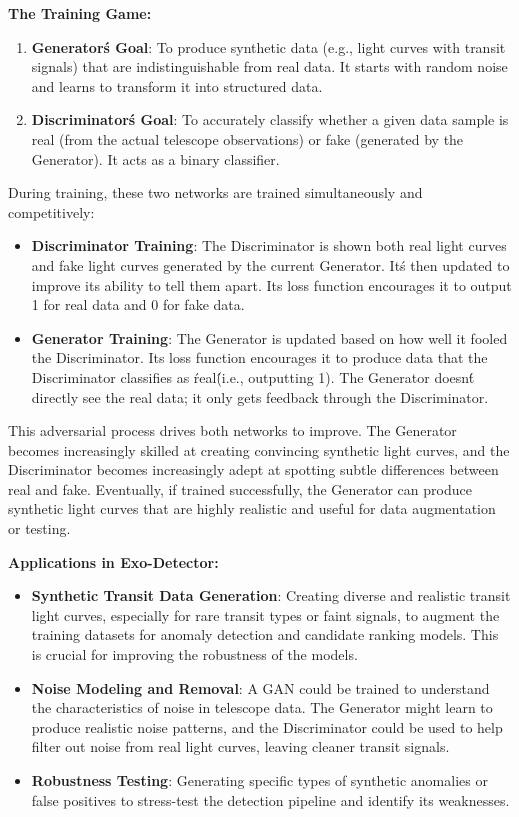 \documentclass{article}
\begin{document}
\textbf{The Training Game:}

\begin{enumerate}
    \item \textbf{Generator\'s Goal}: To produce synthetic data (e.g., light curves with transit signals) that are indistinguishable from real data. It starts with random noise and learns to transform it into structured data.
    \item \textbf{Discriminator\'s Goal}: To accurately classify whether a given data sample is real (from the actual telescope observations) or fake (generated by the Generator). It acts as a binary classifier.
\end{enumerate}

During training, these two networks are trained simultaneously and competitively:

\begin{itemize}
    \item \textbf{Discriminator Training}: The Discriminator is shown both real light curves and fake light curves generated by the current Generator. It\'s then updated to improve its ability to tell them apart. Its loss function encourages it to output 1 for real data and 0 for fake data.
    \item \textbf{Generator Training}: The Generator is updated based on how well it fooled the Discriminator. Its loss function encourages it to produce data that the Discriminator classifies as \'real\' (i.e., outputting 1). The Generator doesn\'t directly see the real data; it only gets feedback through the Discriminator.
\end{itemize}

This adversarial process drives both networks to improve. The Generator becomes increasingly skilled at creating convincing synthetic light curves, and the Discriminator becomes increasingly adept at spotting subtle differences between real and fake. Eventually, if trained successfully, the Generator can produce synthetic light curves that are highly realistic and useful for data augmentation or testing.

\textbf{Applications in Exo-Detector:}

\begin{itemize}
    \item \textbf{Synthetic Transit Data Generation}: Creating diverse and realistic transit light curves, especially for rare transit types or faint signals, to augment the training datasets for anomaly detection and candidate ranking models. This is crucial for improving the robustness of the models.
    \item \textbf{Noise Modeling and Removal}: A GAN could be trained to understand the characteristics of noise in telescope data. The Generator might learn to produce realistic noise patterns, and the Discriminator could be used to help filter out noise from real light curves, leaving cleaner transit signals.
    \item \textbf{Robustness Testing}: Generating specific types of synthetic anomalies or false positives to stress-test the detection pipeline and identify its weaknesses.
\end{itemize}
\end{document}
